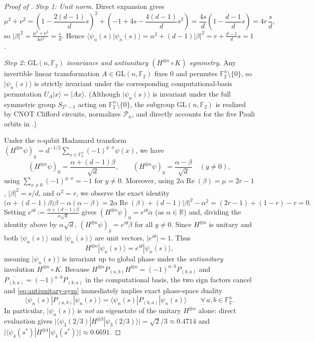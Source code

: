 \documentclass[11pt,a4paper]{article}
\theoremstyle{plain}
\theoremstyle{definition}
\theoremstyle{remark}
\newcommand{\R}{\mathbb{R}}
\newcommand{\F}{\mathbb{F}}
\newcommand{\Pauli}{\mathcal{P}}
\newcommand{\GL}{\mathrm{GL}}
\newcommand{\RePart}{\operatorname{Re}}
\newcommand{\ket}[1]{|#1\rangle}
\newcommand{\braket}[2]{\langle#1|#2\rangle}
\newcommand{\expval}[2]{\langle#1|#2|#1\rangle}
\newcommand{\abs}[1]{\lvert#1\rvert}
\numberwithin{equation}{section}
\begin{document}
\begin{proof}[Proof of ]
\emph{Step 1: Unit norm.}
Direct expansion gives
\[
  \mu^2 + \nu^2 = \left(1 - \frac{2(d-1)}{d}s\right)^2 + \left(-1 + 4s - \frac{4(d-1)}{d}s^2\right)
  = \frac{4s}{d}\left(1 - \frac{d-1}{d}s\right) = 4r\,\frac{s}{d},
\]
so $\abs{\beta}^2 = \frac{\mu^2 + \nu^2}{4\alpha^2} = \frac{s}{d}$. Hence $\braket{\psi_n(s)}{\psi_n(s)} = \alpha^2 + (d-1)\abs{\beta}^2 = r + \frac{d-1}{d}s = 1$.

\emph{Step 2: $\GL(n, \F_2)$ invariance and antiunitary $(H^{\otimes n}\circ K)$ symmetry.}
Any invertible linear transformation $A \in \GL(n, \F_2)$ fixes $0$ and permutes $\F_2^n \setminus \{0\}$, so $\ket{\psi_n(s)}$ is strictly invariant under the corresponding computational-basis permutation $U_A\ket{x} = \ket{Ax}$. (Although $\ket{\psi_n(s)}$ is invariant under the full symmetric group $S_{2^n-1}$ acting on $\F_2^n \setminus \{0\}$, the subgroup $\GL(n, \F_2)$ is realized by CNOT Clifford circuits, normalizes $\Pauli_n$, and directly accounts for the five Pauli orbits in .)

Under the $n$-qubit Hadamard transform $(H^{\otimes n}\psi)_y = d^{-1/2}\sum_{x \in \F_2^n} (-1)^{y \cdot x}\psi(x)$, we have
\[
  (H^{\otimes n}\psi)_0 = \frac{\alpha + (d-1)\beta}{\sqrt{d}},
  \qquad
  (H^{\otimes n}\psi)_y = \frac{\alpha - \beta}{\sqrt{d}} \quad (y \neq 0),
\]
using $\sum_{x \neq 0}(-1)^{y \cdot x} = -1$ for $y \neq 0$. Moreover, using $2\alpha\RePart(\beta) = \mu = 2r - 1$, $\abs{\beta}^2 = s/d$, and $\alpha^2 = r$, we observe the exact identity
\[
  \bigl(\alpha + (d-1)\beta\bigr)\overline{\beta} - \alpha(\alpha - \beta)
  = 2\alpha\RePart(\beta) + (d-1)\abs{\beta}^2 - \alpha^2
  = (2r - 1) + (1 - r) - r = 0.
\]
Setting $e^{i\theta} := \frac{\alpha + (d-1)\beta}{\alpha\sqrt{d}}$ gives $(H^{\otimes n}\psi)_0 = e^{i\theta}\overline{\alpha}$ (as $\alpha \in \R$) and, dividing the identity above by $\alpha\sqrt{d}$, $(H^{\otimes n}\psi)_y = e^{i\theta}\overline{\beta}$ for all $y \neq 0$. Since $H^{\otimes n}$ is unitary and both $\ket{\psi_n(s)}$ and $\ket{\overline{\psi_n(s)}}$ are unit vectors, $\abs{e^{i\theta}} = 1$. Thus
\begin{equation}\label{eq:antiunitary-sym}
  H^{\otimes n}\ket{\psi_n(s)} = e^{i\theta}\ket{\overline{\psi_n(s)}},
\end{equation}
meaning $\ket{\psi_n(s)}$ is invariant up to global phase under the \emph{antiunitary} involution $H^{\otimes n} \circ K$. Because $H^{\otimes n} P_{(a,b)} H^{\otimes n} = (-1)^{a \cdot b} P_{(b,a)}$ and $\overline{P_{(b,a)}} = (-1)^{a \cdot b} P_{(b,a)}$ in the computational basis, the two sign factors cancel and \eqref{eq:antiunitary-sym} immediately implies exact phase-space duality
\[
  \expval{\psi_n(s)}{P_{(a,b)}} = \expval{\psi_n(s)}{P_{(b,a)}} \qquad \forall\, a, b \in \F_2^n.
\]
In particular, $\ket{\psi_n(s)}$ is \emph{not} an eigenstate of the unitary $H^{\otimes n}$ alone: direct evaluation gives $\abs{\expval{\psi_3(2/3)}{H^{\otimes 3}}} = \sqrt{2}/3 \approx 0.4714$ and $\abs{\expval{\psi_4(s^*)}{H^{\otimes 4}}} \approx 0.6691$.


\end{proof}
\end{document}
